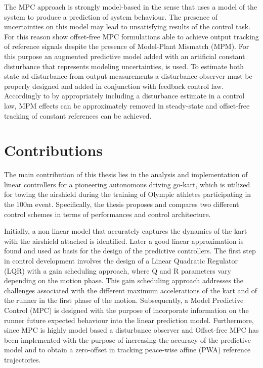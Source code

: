 \documentclass[a4paper,12pt,oneside]{book}
\begin{document}
\bigskip
The MPC approach is strongly model-based in the sense that uses a model of the system to produce a prediction of system behaviour. The presence of uncertainties on this model may lead to unsatisfying results of the control task. 
For this reason \cite{Offset-free_compare, Linear_offset-free} show offset-free MPC formulations able to achieve output tracking of reference signals despite the presence of Model-Plant Mismatch (MPM).
For this purpose an augmented predictive model added with an artificial constant disturbance that represents modeling uncertainties, is used. 
To estimate both state ad disturbance from output measurements a disturbance observer must be properly designed and added in conjunction with feedback control law.
Accordingly to \cite{Disturbance_observer} by appropriately including a disturbance estimate in a control law, MPM effects can be approximately removed in steady-state and offset-free tracking of constant references can be achieved.


	
\section*{Contributions}
The main contribution of this thesis lies in the analysis and implementation of linear controllers for a pioneering autonomous driving go-kart, which is utilized for towing the airshield during the training of Olympic athletes participating in the 100m event.
Specifically, the thesis proposes and compares two different control schemes in terms of performances and control architecture.

\bigskip
Initially, a non linear model that accurately captures the dynamics of the kart with the airshield attached is identified. 
Later a good linear approximation is found and used as basis for the design of the predictive controllers.
The first step in control development involves the design of a Linear Quadratic Regulator (LQR) with a gain scheduling approach, where Q and R parameters vary depending on the motion phase. This gain scheduling approach addresses the challenges associated with the different maximum accelerations of the kart and of the runner in the first phase of the motion.
Subsequently, a Model Predictive Control (MPC) is designed with the purpose of incorporate information on the runner future expected behaviour into the linear prediction model. 
Furthermore, since MPC is highly model based a disturbance observer and Offset-free MPC has been implemented with the purpose of increasing the accuracy of the predictive model and to obtain a zero-offset in tracking peace-wise affine (PWA) reference trajectories.
\end{document}
